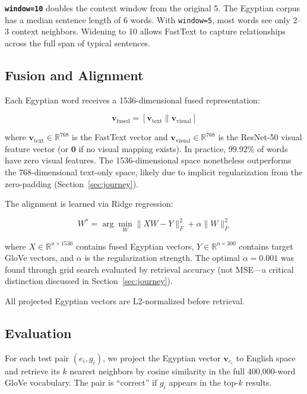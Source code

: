 \documentclass[11pt, a4paper]{article}
\begin{document}
\textbf{\texttt{window=10}} doubles the context window from the original 5. The Egyptian corpus has a median sentence length of 6 words. With \texttt{window=5}, most words see only 2--3 context neighbors. Widening to 10 allows FastText to capture relationships across the full span of typical sentences.

\subsection{Fusion and Alignment}

Each Egyptian word receives a 1536-dimensional fused representation:

\begin{equation}
    \mathbf{v}_{\text{fused}} = [\mathbf{v}_{\text{text}} \| \mathbf{v}_{\text{visual}}]
\end{equation}

where $\mathbf{v}_{\text{text}} \in \mathbb{R}^{768}$ is the FastText vector and $\mathbf{v}_{\text{visual}} \in \mathbb{R}^{768}$ is the ResNet-50 visual feature vector (or $\mathbf{0}$ if no visual mapping exists). In practice, 99.92\% of words have zero visual features. The 1536-dimensional space nonetheless outperforms the 768-dimensional text-only space, likely due to implicit regularization from the zero-padding (Section~\ref{sec:journey}).

The alignment is learned via Ridge regression:

\begin{equation}
    W^* = \arg\min_W \| XW - Y \|_F^2 + \alpha \| W \|_F^2
\end{equation}

where $X \in \mathbb{R}^{n \times 1536}$ contains fused Egyptian vectors, $Y \in \mathbb{R}^{n \times 300}$ contains target GloVe vectors, and $\alpha$ is the regularization strength. The optimal $\alpha = 0.001$ was found through grid search evaluated by retrieval accuracy (not MSE---a critical distinction discussed in Section~\ref{sec:journey}).

All projected Egyptian vectors are L2-normalized before retrieval.

\subsection{Evaluation}

For each test pair $(e_i, g_i)$, we project the Egyptian vector $\mathbf{v}_{e_i}$ to English space and retrieve its $k$ nearest neighbors by cosine similarity in the full 400,000-word GloVe vocabulary. The pair is ``correct'' if $g_i$ appears in the top-$k$ results.
\end{document}
